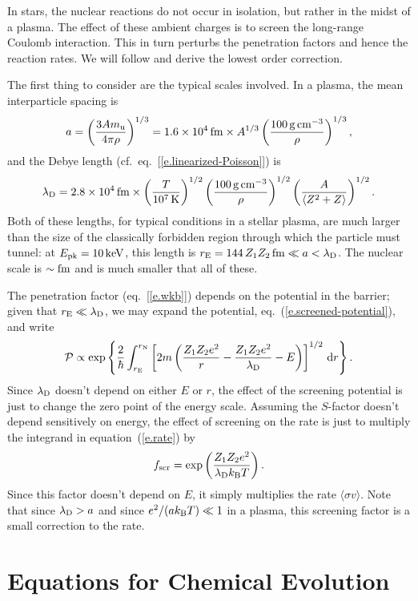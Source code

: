In stars, the nuclear reactions do not occur in isolation, but rather in the midst of a plasma.  The effect of these ambient charges is to screen the long-range Coulomb interaction. This in turn perturbs the penetration factors and hence the reaction rates. We will follow \citet{Salpeter1954Electrons-Scree} and derive the lowest order correction. 

The first thing to consider are the typical scales involved.  In a plasma, the mean interparticle spacing is 
\[ a = \left(\frac{3Am_\mathrm{u}}{4\pi \rho}\right)^{1/3} = 1.6\times 10^{4}\,\mathrm{fm}\times A^{1/3}\left(\frac{100\,\mathrm{g}\,{\mathrm{c}\mathrm{m}}^{-3}}{\rho}\right)^{1/3},
\]
and the Debye length (cf.\ eq.~[\ref{e.linearized-Poisson}]) is 
\[
\lambda_{\mathrm{D}} = 2.8\times 10^{4}\,\mathrm{fm}\times \left(\frac{T}{10^{7}\,\mathrm{K}}\right)^{1/2} \left(\frac{100\,\mathrm{g}\,{\mathrm{c}\mathrm{m}}^{-3}}{\rho}\right)^{1/2} \left(\frac{A}{\langle Z^{2}+Z\rangle}\right)^{1/2}.
\]
Both of these lengths, for typical conditions in a stellar plasma, are much larger than the size of the classically forbidden region through which the particle must tunnel: at $E_{\mathrm{pk}} = 10\,\mathrm{k}\mathrm{eV}$, this length is $r_{\mathrm{E}} = 144\,Z_{1}Z_{2}\,\mathrm{fm} \ll a < \lambda_{\mathrm{D}}$.  The nuclear scale is $\sim\mathrm{fm}$ and is much smaller that all of these.

The penetration factor (eq.~[\ref{e.wkb}]) depends on the potential in the barrier; given that $r_{\mathrm{E}} \ll \lambda_{\mathrm{D}}$, we may expand the potential, eq.~(\ref{e.screened-potential}), and write
\begin{equation}
\mathcal{P} \propto \exp\left\{\frac{2}{\hbar}\int_{r_{\mathrm{E}}}^{r_{\mathrm{N}}}\left[2m\left(\frac{Z_{1}Z_{2}e^{2}}{r} - \frac{Z_{1}Z_{2}e^{2}}{\lambda_{\mathrm{D}}} - E\right) \right]^{1/2}\,\mathrm{d} r\right\}.
\end{equation}
Since $\lambda_{\mathrm{D}}$ doesn't depend on either $E$ or $r$, the effect of the screening potential is just to  change the zero point of the energy scale.  Assuming the $S$-factor doesn't depend sensitively on energy, the effect of screening on the rate is just to multiply the integrand in equation~(\ref{e.rate}) by
\begin{equation}\label{e.fscreening}
  f_{\mathrm{scr}} = \exp\left(\frac{Z_{1}Z_{2}e^{2}}{\lambda_{\mathrm{D}}k_\mathrm{B} T}\right).
\end{equation}
Since this factor doesn't depend on $E$, it simply multiplies the rate $\langle\sigma v\rangle$.  Note that since $\lambda_{\mathrm{D}} > a$ and since $e^{2}/(ak_\mathrm{B} T) \ll 1$ in a plasma, this screening factor is a small correction to the rate.

\section{Equations for Chemical Evolution}\label{e.eqns-for-chem-evol}

